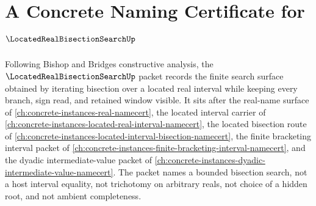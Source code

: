 \chapter{A Concrete Naming Certificate for $\LocatedRealBisectionSearchUp$}
\label{ch:concrete-instances-located-real-bisection-search-namecert}

Following Bishop and Bridges constructive analysis, the $\LocatedRealBisectionSearchUp$ packet records the finite search surface obtained by iterating bisection over a located real interval while keeping every branch, sign read, and retained window visible. It sits after the real-name surface of \autoref{ch:concrete-instances-real-namecert}, the located interval carrier of \autoref{ch:concrete-instances-located-real-interval-namecert}, the located bisection route of \autoref{ch:concrete-instances-located-interval-bisection-namecert}, the finite bracketing interval packet of \autoref{ch:concrete-instances-finite-bracketing-interval-namecert}, and the dyadic intermediate-value packet of \autoref{ch:concrete-instances-dyadic-intermediate-value-namecert}. The packet names a bounded bisection search, not a host interval equality, not trichotomy on arbitrary reals, not choice of a hidden root, and not ambient completeness.

